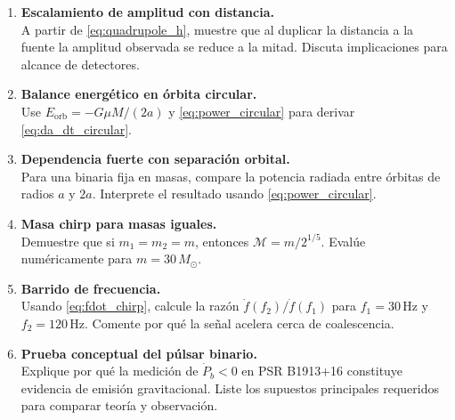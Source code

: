 \begin{enumerate}[leftmargin=2.2em, label=\textbf{P\arabic*.}]

\item \textbf{Escalamiento de amplitud con distancia.} \\
A partir de \eqref{eq:quadrupole_h}, muestre que al duplicar la distancia a la fuente la amplitud observada se reduce a la mitad. Discuta implicaciones para alcance de detectores.

\item \textbf{Balance energético en órbita circular.} \\
Use $E_{\mathrm{orb}}=-G\mu M/(2a)$ y \eqref{eq:power_circular} para derivar \eqref{eq:da_dt_circular}.

\item \textbf{Dependencia fuerte con separación orbital.} \\
Para una binaria fija en masas, compare la potencia radiada entre órbitas de radios $a$ y $2a$. Interprete el resultado usando \eqref{eq:power_circular}.

\item \textbf{Masa chirp para masas iguales.} \\
Demuestre que si $m_1=m_2=m$, entonces $\mathcal{M}=m/2^{1/5}$. Evalúe numéricamente para $m=30\,M_\odot$.

\item \textbf{Barrido de frecuencia.} \\
Usando \eqref{eq:fdot_chirp}, calcule la razón $\dot f(f_2)/\dot f(f_1)$ para $f_1=30\,\mathrm{Hz}$ y $f_2=120\,\mathrm{Hz}$. Comente por qué la señal acelera cerca de coalescencia.

\item \textbf{Prueba conceptual del púlsar binario.} \\
Explique por qué la medición de $\dot P_b<0$ en PSR B1913+16 constituye evidencia de emisión gravitacional. Liste los supuestos principales requeridos para comparar teoría y observación.

\end{enumerate}
